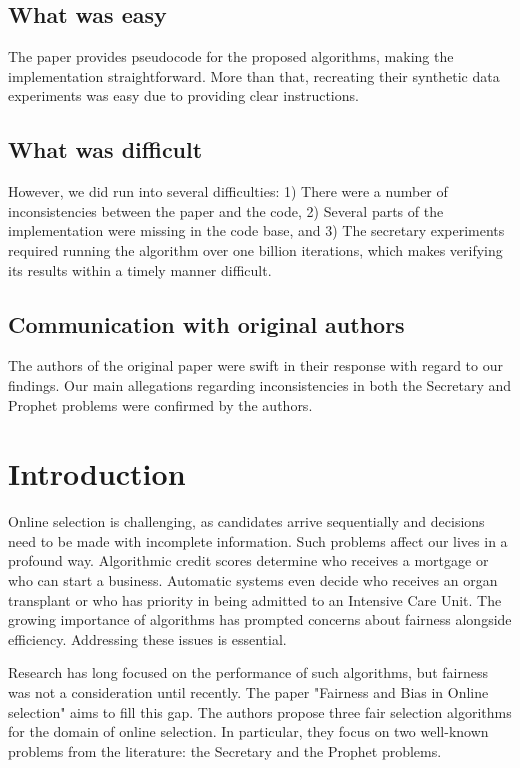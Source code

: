 \subsection*{What was easy}

The paper provides pseudocode for the proposed algorithms, making the implementation straightforward. More than that, recreating their synthetic data experiments was easy due to providing clear instructions.

\subsection*{What was difficult}
However, we did run into several difficulties: 1) There were a number of inconsistencies between the paper and the code, 2) Several parts of the implementation were missing in the code base, and 3) The secretary experiments required running the algorithm over one billion iterations, which makes verifying its results within a timely manner difficult.

\subsection*{Communication with original authors}
The authors of the original paper were swift in their response with regard to our findings. Our main allegations regarding inconsistencies in both the Secretary and Prophet problems were confirmed by the authors.

\section{Introduction}

Online selection is challenging, as candidates arrive sequentially and decisions need to be made with incomplete information. Such problems affect our lives in a profound way. Algorithmic credit scores determine who receives a mortgage or who can start a business. Automatic systems even decide who receives an organ transplant or who has priority in being admitted to an Intensive Care Unit. The growing importance of algorithms has prompted concerns about fairness alongside efficiency. Addressing these issues is essential.

 Research has long focused on the performance of such algorithms, but fairness was not a consideration until recently.\citet{buchbinder2014secretary,Cayci2020} The paper "Fairness and Bias in Online selection" \citet{correa21} aims to fill this gap. The authors propose three fair selection algorithms for the  domain of online selection. In particular, they focus on two well-known problems from the literature: the Secretary and the Prophet problems.


